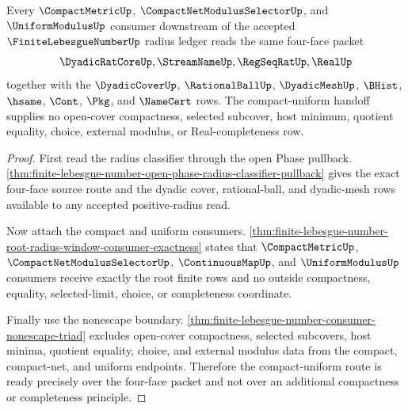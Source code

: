 \begin{theorem}
\label{thm:finite-lebesgue-number-compact-uniform-four-face-readiness}
Every $\CompactMetricUp$, $\CompactNetModulusSelectorUp$, and $\UniformModulusUp$ consumer downstream of the accepted $\FiniteLebesgueNumberUp$ radius ledger reads the same four-face packet
$$
\DyadicRatCoreUp,\StreamNameUp,\RegSeqRatUp,\RealUp
$$
together with the $\DyadicCoverUp$, $\RationalBallUp$, $\DyadicMeshUp$, $\BHist$, $\hsame$, $\Cont$, $\Pkg$, and $\NameCert$ rows. The compact-uniform handoff supplies no open-cover compactness, selected subcover, host minimum, quotient equality, choice, external modulus, or Real-completeness row.
\end{theorem}
\begin{proof}
First read the radius classifier through the open Phase pullback. \autoref{thm:finite-lebesgue-number-open-phase-radius-classifier-pullback} gives the exact four-face source route and the dyadic cover, rational-ball, and dyadic-mesh rows available to any accepted positive-radius read.

Now attach the compact and uniform consumers. \autoref{thm:finite-lebesgue-number-root-radius-window-consumer-exactness} states that $\CompactMetricUp$, $\CompactNetModulusSelectorUp$, $\ContinuousMapUp$, and $\UniformModulusUp$ consumers receive exactly the root finite rows and no outside compactness, equality, selected-limit, choice, or completeness coordinate.

Finally use the nonescape boundary. \autoref{thm:finite-lebesgue-number-consumer-nonescape-triad} excludes open-cover compactness, selected subcovers, host minima, quotient equality, choice, and external modulus data from the compact, compact-net, and uniform endpoints. Therefore the compact-uniform route is ready precisely over the four-face packet and not over an additional compactness or completeness principle.
\end{proof}

